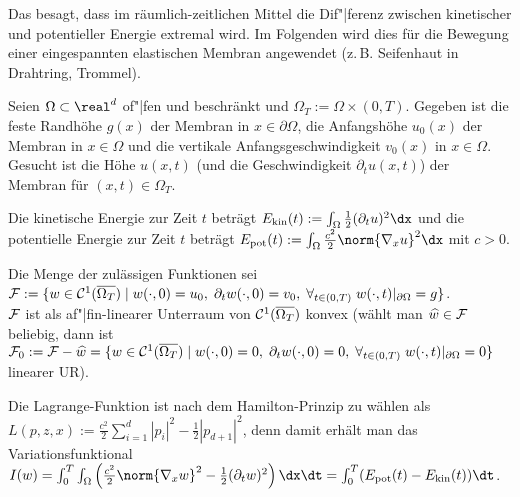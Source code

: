 \linie

\begin{Bsp}
    Das  besagt, dass im räumlich-zeitlichen Mittel
    die Dif"|ferenz zwischen
    kinetischer und potentieller Energie extremal wird.
    Im Folgenden wird dies für die Bewegung einer eingespannten elastischen Membran angewendet
    (z.\,B. Seifenhaut in Drahtring, Trommel).

    Seien $\Omega \subset \real^d$ of"|fen und beschränkt und $\Omega_T := \Omega \times (0, T)$.
    Gegeben ist die feste Randhöhe $g(x)$ der Membran in $x \in \partial\Omega$,
    die Anfangshöhe $u_0(x)$ der Membran in $x \in \Omega$ und
    die vertikale Anfangsgeschwindigkeit $v_0(x)$ in $x \in \Omega$.
    Gesucht ist die Höhe $u(x, t)$ (und die Geschwindigkeit $\partial_t u(x, t)$)
    der Membran für $(x, t) \in \Omega_T$.

    Die kinetische Energie zur Zeit $t$ beträgt
    $E_\kin(t) := \int_\Omega \frac{1}{2} (\partial_t u)^2 \dx$ und
    die potentielle Energie zur Zeit $t$ beträgt
    $E_\pot(t) := \int_\Omega \frac{c^2}{2} \norm{\nabla_x u}^2 \dx$ mit $c > 0$.

    Die Menge der zulässigen Funktionen sei\\
    $\mathcal{F} := \{w \in \mathcal{C}^1(\overline{\Omega_T}) \;|\; w(\cdot, 0) = u_0,\;
    \partial_t w(\cdot, 0) = v_0,\;
    \forall_{t \in (0, T)}\; w(\cdot, t)|_{\partial\Omega} = g\}$.\\
    $\mathcal{F}$ ist als af"|fin-linearer Unterraum von $\mathcal{C}^1(\overline{\Omega_T})$ konvex
    (wählt man $\widehat{w} \in \mathcal{F}$ beliebig, dann ist
    $\mathcal{F}_0 := \mathcal{F} - \widehat{w} = \{w \in \mathcal{C}^1(\overline{\Omega_T}) \;|\;
    w(\cdot, 0) = 0,\; \partial_t w(\cdot, 0) = 0,\;
    \forall_{t \in (0, T)}\; w(\cdot, t)|_{\partial\Omega} = 0\}$
    linearer UR).

    Die Lagrange-Funktion ist nach dem Hamilton-Prinzip zu wählen als\\
    $L(p, z, x) := \frac{c^2}{2} \sum_{i=1}^d |p_i|^2 - \frac{1}{2} |p_{d+1}|^2$,
    denn damit erhält man das Variationsfunktional\\
    $I(w) = \int_0^T \int_\Omega
    \left(\frac{c^2}{2} \norm{\nabla_x w}^2 - \frac{1}{2} (\partial_t w)^2\right) \dx\dt
    = \int_0^T (E_\pot(t) - E_\kin(t)) \dt$.
\end{Bsp}

\linie
\pagebreak

